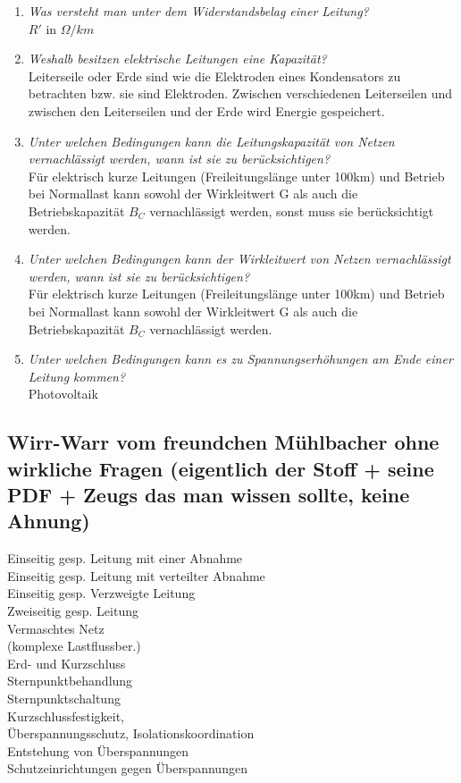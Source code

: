 \documentclass[12pt]{article}
\begin{document}
\begin{enumerate}
    \item \textit{Was versteht man unter dem Widerstandsbelag 
    einer Leitung?}\\
    $R'$ in $\Omega / km$

    \item \textit{Weshalb besitzen elektrische Leitungen eine 
    Kapazität?}\\
    Leiterseile oder Erde sind wie die Elektroden eines Kondensators zu betrachten bzw. 
    sie sind Elektroden. Zwischen verschiedenen Leiterseilen und zwischen den Leiterseilen und der Erde wird Energie gespeichert.
    \item \textit{Unter welchen Bedingungen kann die 
    Leitungskapazität von Netzen vernachlässigt 
    werden, wann ist sie zu berücksichtigen?}\\
    Für elektrisch kurze Leitungen (Freileitungslänge unter 100km) und Betrieb bei 
    Normallast kann sowohl der Wirkleitwert G als auch die Betriebskapazität $B_C$
    vernachlässigt werden, sonst muss sie berücksichtigt werden.
    \item \textit{Unter welchen Bedingungen kann der Wirkleitwert 
    von Netzen vernachlässigt werden, wann ist sie zu 
    berücksichtigen?}\\
    Für elektrisch kurze Leitungen (Freileitungslänge unter 100km) und Betrieb bei 
    Normallast kann sowohl der Wirkleitwert G als auch die Betriebskapazität $B_C$
    vernachlässigt werden.
    \item \textit{Unter welchen Bedingungen kann es zu 
    Spannungserhöhungen am Ende einer Leitung 
    kommen?}\\
    Photovoltaik


\end{enumerate}





\subsection{Wirr-Warr vom freundchen Mühlbacher ohne wirkliche Fragen (eigentlich der Stoff + seine PDF + Zeugs das man wissen sollte, keine Ahnung)}



Einseitig gesp. Leitung mit einer Abnahme \\
Einseitig gesp. Leitung mit verteilter Abnahme \\
Einseitig gesp. Verzweigte Leitung \\
Zweiseitig gesp. Leitung \\
Vermaschtes Netz \\
(komplexe Lastflussber.) \\
Erd- und Kurzschluss \\
Sternpunktbehandlung \\
Sternpunktschaltung \\
Kurzschlussfestigkeit, \\
Überspannungsschutz, Isolationskoordination \\
Entstehung von Überspannungen \\
Schutzeinrichtungen gegen Überspannungen \\
\end{document}
